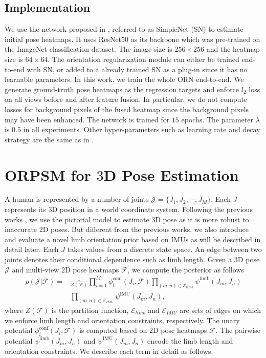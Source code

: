 \documentclass[10pt,twocolumn,letterpaper]{article}
\begin{document}
\subsection{Implementation}
We use the network proposed in \cite{simplebaselines}, referred to as SimpleNet (SN) to estimate initial pose heatmaps. It uses ResNet50 \cite{he2016deep} as its backbone which was pre-trained on the ImageNet classification dataset. The image size is $256 \times 256$ and the heatmap size is $64 \times 64$. 
The orientation regularization module can either be trained end-to-end with SN, or added to a already trained SN as a plug-in since it has no learnable parameters. In this work, we train the whole ORN end-to-end.
We generate ground-truth pose heatmaps as the regression targets and enforce $l_\text{2}$ loss on all views before and after feature fusion. In particular, we do not compute losses for background pixels of the fused heatmap since the background pixels may have been enhanced.
The network is trained for $15$ epochs. The parameter $\lambda$ is $0.5$ in all experiments. Other hyper-parameters such as learning rate and decay strategy are the same as in \cite{simplebaselines}. 


\section{ORPSM for $3$D Pose Estimation}
A human is represented by a number of joints $\mathcal{J}=\{{J}_1,
{J}_2,\cdots,{J}_M\}$. Each ${J}$ represents its $3$D position in a world coordinate system. Following the previous works \cite{kostrikov2014depth,PavlakosZDD17,belagiannis20143D,qiu2019cross}, we use the pictorial model to estimate $3$D pose as it is more robust to inaccurate $2$D poses. But different from the previous works, we also introduce and evaluate a novel limb orientation prior based on IMUs as will be described in detail later. Each ${J}$ takes values from a discrete state space. An edge between two joints denotes their conditional dependence such as limb length. Given a $3$D pose $\mathcal{J}$ and multi-view $2$D pose heatmaps $\mathcal{F}$, we compute the posterior as follows
\begin{equation}
\begin{split}
    p(\mathcal{J} | \mathcal{F})= &\frac{1}{Z(\mathcal{F})} \prod_{i=1}^M{\phi_i^{\text{conf}}({J}_i, \mathcal{F})}\prod_{(m, n) \in \mathcal{E}_{limb}}{\psi^{\text{limb}}({J}_m, {J}_n)} \\
    &\prod_{(m, n) \in \mathcal{E}_{IMU}}{\psi^{\text{IMU}}({J}_m, {J}_n)},
    \label{eq:psm}
\end{split}
\end{equation}
where $Z(\mathcal{F})$ is the partition function, $\mathcal{E}_{limb}$ and $\mathcal{E}_{IMU}$ are sets of edges on which we enforce limb length and orientation constraints, respectively. The unary potential $\phi_i^{\text{conf}}({J}_i, \mathcal{F})$ is computed based on $2$D pose heatmaps $\mathcal{F}$. The pairwise potential $\psi^{\text{limb}}({J}_m, {J}_n)$ and $\psi^{\text{IMU}}({J}_m, {J}_n)$ encode the limb length and orientation constraints. We describe each term in detail as follows.
\end{document}
